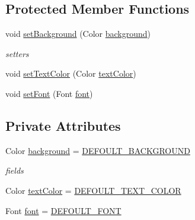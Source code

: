 \subsection*{Protected Member Functions}
\begin{DoxyCompactItemize}
\item 
void \hyperlink{classit_1_1emarolab_1_1cagg_1_1debugging_1_1baseComponents_1_1LoggingTable_1_1CellFormatter_a6df806f42c6036df395c7a34e9952e61}{set\-Background} (Color \hyperlink{classit_1_1emarolab_1_1cagg_1_1debugging_1_1baseComponents_1_1LoggingTable_1_1CellFormatter_a0c6681b4cacf6a18080715c470d83d60}{background})
\begin{DoxyCompactList}\small\item\em setters \end{DoxyCompactList}\item 
void \hyperlink{classit_1_1emarolab_1_1cagg_1_1debugging_1_1baseComponents_1_1LoggingTable_1_1CellFormatter_a27b3a19ab348b793116b057a5aced209}{set\-Text\-Color} (Color \hyperlink{classit_1_1emarolab_1_1cagg_1_1debugging_1_1baseComponents_1_1LoggingTable_1_1CellFormatter_ac2464203aac41fcb1c8824a25ac45f94}{text\-Color})
\item 
void \hyperlink{classit_1_1emarolab_1_1cagg_1_1debugging_1_1baseComponents_1_1LoggingTable_1_1CellFormatter_a8120cba6720d0488bb6a6e6bfd3a5091}{set\-Font} (Font \hyperlink{classit_1_1emarolab_1_1cagg_1_1debugging_1_1baseComponents_1_1LoggingTable_1_1CellFormatter_a6da5ace38748e723cc0405c8b612ff1c}{font})
\end{DoxyCompactItemize}
\subsection*{Private Attributes}
\begin{DoxyCompactItemize}
\item 
Color \hyperlink{classit_1_1emarolab_1_1cagg_1_1debugging_1_1baseComponents_1_1LoggingTable_1_1CellFormatter_a0c6681b4cacf6a18080715c470d83d60}{background} = \hyperlink{classit_1_1emarolab_1_1cagg_1_1debugging_1_1baseComponents_1_1LoggingTable_a5a4fb1b558565ce1589eb5d79f91a258}{D\-E\-F\-O\-U\-L\-T\-\_\-\-B\-A\-C\-K\-G\-R\-O\-U\-N\-D}
\begin{DoxyCompactList}\small\item\em fields \end{DoxyCompactList}\item 
Color \hyperlink{classit_1_1emarolab_1_1cagg_1_1debugging_1_1baseComponents_1_1LoggingTable_1_1CellFormatter_ac2464203aac41fcb1c8824a25ac45f94}{text\-Color} = \hyperlink{classit_1_1emarolab_1_1cagg_1_1debugging_1_1baseComponents_1_1LoggingTable_ae2b40893d267aec7c1d96d049200abf0}{D\-E\-F\-O\-U\-L\-T\-\_\-\-T\-E\-X\-T\-\_\-\-C\-O\-L\-O\-R}
\item 
Font \hyperlink{classit_1_1emarolab_1_1cagg_1_1debugging_1_1baseComponents_1_1LoggingTable_1_1CellFormatter_a6da5ace38748e723cc0405c8b612ff1c}{font} = \hyperlink{classit_1_1emarolab_1_1cagg_1_1debugging_1_1baseComponents_1_1LoggingTable_addf06fe589b3662da818938bb2aca7fe}{D\-E\-F\-O\-U\-L\-T\-\_\-\-F\-O\-N\-T}
\end{DoxyCompactItemize}


